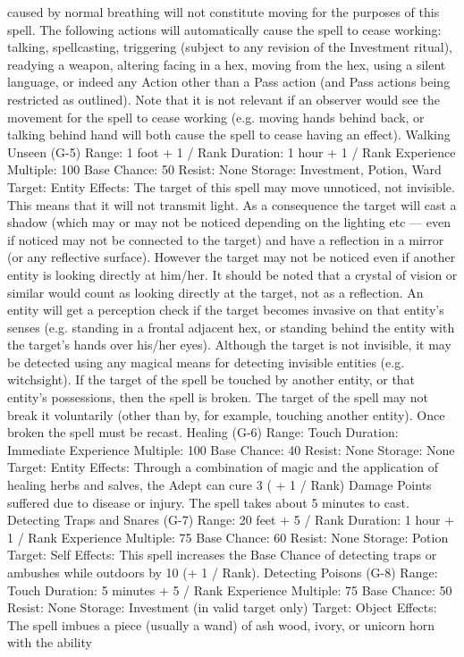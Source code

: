 \documentclass[a4paper]{article}
\begin{document}
\begin{multicols}{3}
caused by normal breathing will not constitute
moving for the purposes of this spell. The following actions will automatically cause the spell to
cease working: talking, spellcasting, triggering
(subject to any revision of the Investment ritual),
readying a weapon, altering facing in a hex, moving from the hex, using a silent language, or indeed
any Action other than a Pass action (and Pass actions being restricted as outlined). Note that it is
not relevant if an observer would see the movement for the spell to cease working (e.g. moving
hands behind back, or talking behind hand will
both cause the spell to cease having an effect).
Walking Unseen (G-5)
Range: 1 foot + 1 / Rank
Duration: 1 hour + 1 / Rank
Experience Multiple: 100
Base Chance: 50%
Resist: None
Storage: Investment, Potion, Ward
Target: Entity
Effects: The target of this spell may move unnoticed, not invisible. This means that it will not
transmit light. As a consequence the target will cast
a shadow (which may or may not be noticed depending on the lighting etc — even if noticed may
not be connected to the target) and have a reflection in a mirror (or any reflective surface). However the target may not be noticed even if another
entity is looking directly at him/her. It should be
noted that a crystal of vision or similar would
count as looking directly at the target, not as a
reflection. An entity will get a perception check if
the target becomes invasive on that entity’s senses
(e.g. standing in a frontal adjacent hex, or standing
behind the entity with the target’s hands over
his/her eyes). Although the target is not invisible, it
may be detected using any magical means for
detecting invisible entities (e.g. witchsight).
If the target of the spell be touched by another
entity, or that entity’s possessions, then the spell is
broken. The target of the spell may not break it
voluntarily (other than by, for example, touching
another entity). Once broken the spell must be
recast.
Healing (G-6)
Range: Touch
Duration: Immediate
Experience Multiple: 100
Base Chance: 40%
Resist: None
Storage: None
Target: Entity
Effects: Through a combination of magic and the
application of healing herbs and salves, the Adept
can cure 3 ( + 1 / Rank) Damage Points suffered
due to disease or injury. The spell takes about 5
minutes to cast.
Detecting Traps and Snares (G-7)
Range: 20 feet + 5 / Rank
Duration: 1 hour + 1 / Rank
Experience Multiple: 75
Base Chance: 60%
Resist: None
Storage: Potion
Target: Self
Effects: This spell increases the Base Chance of
detecting traps or ambushes while outdoors by 10
(+ 1 / Rank).
Detecting Poisons (G-8)
Range: Touch
Duration: 5 minutes + 5 / Rank
Experience Multiple: 75
Base Chance: 50%
Resist: None
Storage: Investment (in valid target only)
Target: Object
Effects: The spell imbues a piece (usually a wand)
of ash wood, ivory, or unicorn horn with the ability


\end{multicols}
\end{document}
